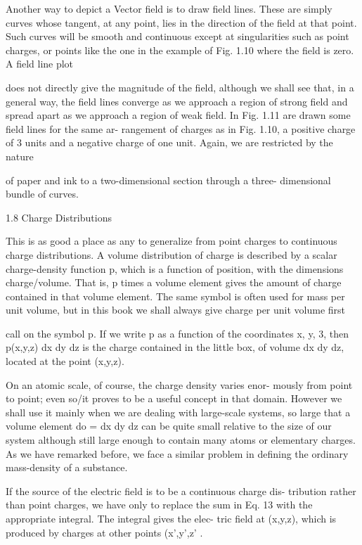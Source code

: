 Another way to depict a Vector field is to draw field lines. These
are simply curves whose tangent, at any point, lies in the direction of
the field at that point. Such curves will be smooth and continuous
except at singularities such as point charges, or points like the one
in the example of Fig. 1.10 where the field is zero. A field line plot

does not directly give the magnitude of the field, although we shall
see that, in a general way, the field lines converge as we approach a
region of strong field and spread apart as we approach a region of
weak field. In Fig. 1.11 are drawn some field lines for the same ar-
rangement of charges as in Fig. 1.10, a positive charge of 3 units and
a negative charge of one unit. Again, we are restricted by the nature

of paper and ink to a two-dimensional section through a three-
dimensional bundle of curves.

1.8 Charge Distributions

This is as good a place as any to generalize from point charges to
continuous charge distributions. A volume distribution of charge is
described by a scalar charge-density function p, which is a function
of position, with the dimensions charge/volume. That is, p times a
volume element gives the amount of charge contained in that volume
element. The same symbol is often used for mass per unit volume,
but in this book we shall always give charge per unit volume first

call on the symbol p. If we write p as a function of the coordinates
x, y, 3, then p(x,y,z) dx dy dz is the charge contained in the little box,
of volume dx dy dz, located at the point (x,y,z).

On an atomic scale, of course, the charge density varies enor-
mously from point to point; even so/it proves to be a useful concept
in that domain. However we shall use it mainly when we are dealing
with large-scale systems, so large that a volume element do =
dx dy dz can be quite small relative to the size of our system although
still large enough to contain many atoms or elementary charges.
As we have remarked before, we face a similar problem in defining
the ordinary mass-density of a substance.

If the source of the electric field is to be a continuous charge dis-
tribution rather than point charges, we have only to replace the sum
in Eq. 13 with the appropriate integral. The integral gives the elec-
tric field at (x,y,z), which is produced by charges at other points
(x',y',z' .


